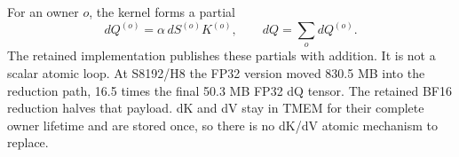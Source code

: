 For an owner $o$, the kernel forms a partial
\begin{equation}
  dQ^{(o)}=\alpha\,dS^{(o)}K^{(o)},\qquad
  dQ=\sum_o dQ^{(o)}.
  \label{eq:dq-owner-reduction}
\end{equation}
The retained implementation publishes these partials with
 addition.  It is not a scalar atomic loop.
At S8192/H8 the FP32 version moved 830.5 MB into the reduction path, 16.5
times the final 50.3 MB FP32 dQ tensor.  The retained BF16 reduction halves
that payload.  dK and dV stay in TMEM for their complete owner lifetime and
are stored once, so there is no dK/dV atomic mechanism to replace.
